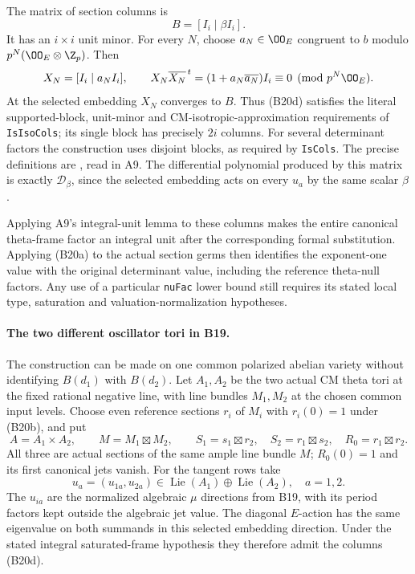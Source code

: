 \documentclass[11pt]{article}
\theoremstyle{definition}\newtheorem{definition}[theorem]{Definition}\newtheorem{remark}[theorem]{Remark}
\begin{document}
The matrix of section columns is
\[
                         B=[I_i\mid\beta I_i].
 \tag{B20d}
\]
It has an $i\times i$ unit minor.  For every $N$, choose
$a_N\in\OO_E$ congruent to $b$ modulo
$p^N(\OO_E\otimes\Z_p)$.  Then
\[
 X_N=[I_i\mid a_NI_i],\qquad
 X_N\overline{X_N}^{\,t}
                  =(1+a_N\overline{a_N})I_i
                        \equiv0\pmod{p^N\OO_E}.
\]
At the selected embedding $X_N$ converges to $B$.
Thus (B20d) satisfies the literal supported-block, unit-minor
and CM-isotropic-approximation requirements of
\texttt{IsIsoCols}; its single block has precisely $2i$ columns.
For several determinant factors the construction uses disjoint
blocks, as required by \texttt{IsCols}.  The precise definitions
are
,
read in A9.  The differential polynomial produced by this
matrix is exactly $\mathcal D_\beta$, since the selected
embedding acts on every $u_a$ by the same scalar $\beta$.

Applying A9's integral-unit lemma to these columns makes the
entire canonical theta-frame factor an integral unit after
the corresponding formal substitution.  Applying (B20a) to
the actual section germs then identifies the exponent-one
value with the original determinant value, including the
reference theta-null factors.  Any use of a particular
\texttt{nuFac} lower bound still requires its stated local
type, saturation and valuation-normalization hypotheses.

\paragraph{The two different oscillator tori in B19.}
The construction can be made on one common polarized abelian
variety without identifying $B(d_1)$ with $B(d_2)$.
Let $A_1,A_2$ be the two actual CM theta tori at the fixed
rational negative line, with line bundles $M_1,M_2$ at the
chosen common input levels.  Choose even reference sections
$r_i$ of $M_i$ with $r_i(0)=1$ under (B20b), and put
\[
 A=A_1\times A_2,\qquad M=M_1\boxtimes M_2,
 \qquad S_1=s_1\boxtimes r_2,
 \quad S_2=r_1\boxtimes s_2,
 \quad R_0=r_1\boxtimes r_2.
 \tag{B20e}
\]
All three are actual sections of the same ample line bundle
$M$; $R_0(0)=1$ and its first canonical jets vanish.
For the tangent rows take
\[
             u_a=(u_{1a},u_{2a})\in
                          \operatorname{Lie}(A_1)\oplus
                          \operatorname{Lie}(A_2),\quad a=1,2.
\]
The $u_{ia}$ are the normalized algebraic $\mu$ directions
from B19, with its period factors kept outside the algebraic
jet value.  The diagonal $E$-action has the same eigenvalue
on both summands in this selected embedding direction.
Under the stated integral saturated-frame hypothesis they
therefore admit the columns (B20d).
\end{document}
